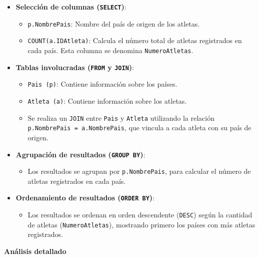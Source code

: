 \begin{itemize}
   \item \textbf{Selección de columnas (\texttt{SELECT})}:
   \begin{itemize}
       \item \texttt{p.NombrePais}: Nombre del país de origen de los atletas.
       \item \texttt{COUNT(a.IDAtleta)}: Calcula el número total de atletas registrados en cada país. Esta columna se denomina \texttt{NumeroAtletas}.
   \end{itemize}

   \item \textbf{Tablas involucradas (\texttt{FROM} y \texttt{JOIN})}:
   \begin{itemize}
       \item \texttt{Pais (p)}: Contiene información sobre los países.
       \item \texttt{Atleta (a)}: Contiene información sobre los atletas.
       \item Se realiza un \texttt{JOIN} entre \texttt{Pais} y \texttt{Atleta} utilizando la relación \texttt{p.NombrePais = a.NombrePais}, que vincula a cada atleta con su país de origen.
   \end{itemize}

   \item \textbf{Agrupación de resultados (\texttt{GROUP BY})}:
   \begin{itemize}
       \item Los resultados se agrupan por \texttt{p.NombrePais}, para calcular el número de atletas registrados en cada país.
   \end{itemize}

   \item \textbf{Ordenamiento de resultados (\texttt{ORDER BY})}:
   \begin{itemize}
       \item Los resultados se ordenan en orden descendente (\texttt{DESC}) según la cantidad de atletas (\texttt{NumeroAtletas}), mostrando primero los países con más atletas registrados.
   \end{itemize}
\end{itemize}

\textbf{Análisis detallado}

